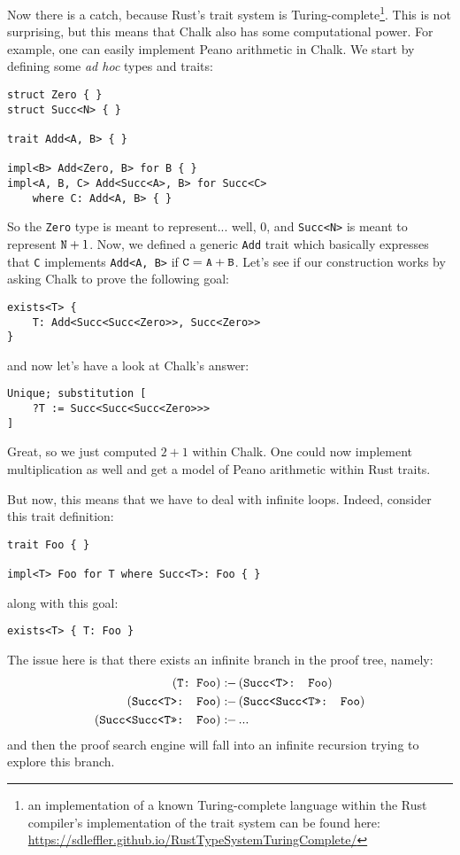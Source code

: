 \documentclass[twocolumn]{article}
\newcommand{\rust}[1]{\texttt{#1}}
\newcommand{\mrust}[1]{\text{\rust{#1}}}
\newcommand{\pif}[0]{:\!\!-\,}
\begin{document}
Now there is a catch, because Rust's trait system is Turing-complete\footnote{an implementation of a known Turing-complete language within the Rust compiler's implementation of the trait system can be found here: \url{https://sdleffler.github.io/RustTypeSystemTuringComplete/}}. This is not surprising, but this means that Chalk also has some computational power. For example, one can easily implement Peano arithmetic in Chalk. We start by defining some \textit{ad hoc} types and traits:
\begin{verbatim}
struct Zero { }
struct Succ<N> { }

trait Add<A, B> { }

impl<B> Add<Zero, B> for B { }
impl<A, B, C> Add<Succ<A>, B> for Succ<C>
    where C: Add<A, B> { }
\end{verbatim}
So the \rust{Zero} type is meant to represent... well, $0$, and \rust{Succ<N>} is meant to represent $\mrust{N} + 1$. Now, we defined a generic \rust{Add} trait which basically expresses that \rust{C} implements \rust{Add<A, B>} if $\mrust{C} = \mrust{A} + \mrust{B}$. Let's see if our construction works by asking Chalk to prove the following goal:
\begin{verbatim}
exists<T> {
    T: Add<Succ<Succ<Zero>>, Succ<Zero>>
}
\end{verbatim}
and now let's have a look at Chalk's answer:
\begin{verbatim}
Unique; substitution [
    ?T := Succ<Succ<Succ<Zero>>>
]
\end{verbatim}
Great, so we just computed $2 + 1$ within Chalk. One could now implement multiplication as well and get a model of Peano arithmetic within Rust traits.

But now, this means that we have to deal with infinite loops. Indeed, consider this trait definition:
\begin{verbatim}
trait Foo { }

impl<T> Foo for T where Succ<T>: Foo { }
\end{verbatim}
along with this goal:
\begin{verbatim}
exists<T> { T: Foo }
\end{verbatim}
The issue here is that there exists an infinite branch in the proof tree, namely:
\[
    \begin{aligned}
    (\mrust{T: Foo}) &\pif (\mrust{Succ<T>: Foo}) \\
    (\mrust{Succ<T>: Foo}) &\pif (\mrust{Succ<Succ<T>>: Foo}) \\
    (\mrust{Succ<Succ<T>>: Foo}) &\pif ...
    \end{aligned}
\]
and then the proof search engine will fall into an infinite recursion trying to explore this branch.
\end{document}
